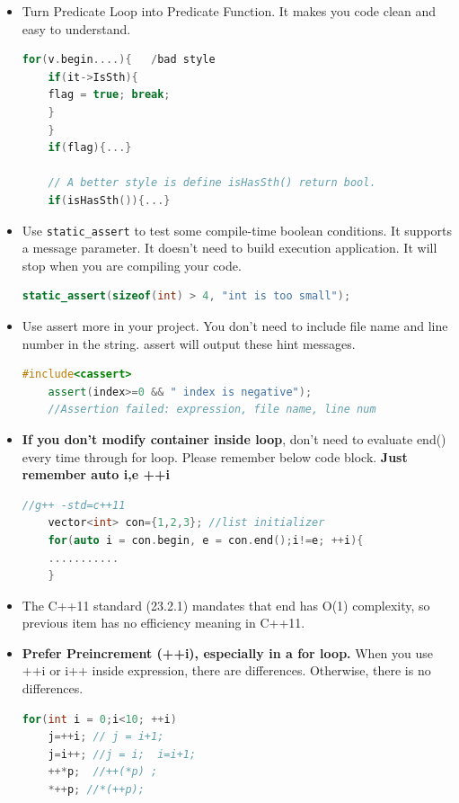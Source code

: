 \documentclass[a4paper,11pt,twoside]{book}
\begin{document}
\begin{itemize}
	\item Turn Predicate Loop into Predicate Function. It makes you code clean and easy to understand.
	
	\begin{lstlisting}[frame=single, language=c++]
	for(v.begin....){   /bad style
	if(it->IsSth){
	flag = true; break;
	}
	}
	if(flag){...}
	
	// A better style is define isHasSth() return bool.
	if(isHasSth()){...}
	\end{lstlisting}
	
	\item Use \texttt{static\_assert} to test some compile-time boolean conditions. It supports a message parameter. It doesn't need to build execution application. It will stop when you are compiling your code. 
	\begin{lstlisting}[frame=single, language=c++]
	static_assert(sizeof(int) > 4, "int is too small");
	\end{lstlisting}
	
	\item Use assert more in your project. You don't need to include file name and line number in the string. assert will output these hint messages.
	\begin{lstlisting}[frame=single, language=c++]
	#include<cassert>
	assert(index>=0 && " index is negative");
	//Assertion failed: expression, file name, line num
	\end{lstlisting}
	
	\item \textbf{If you don't modify container inside loop}, don't need to evaluate end() every time through for loop. Please remember below code block. \textbf{Just remember auto i,e ++i}
	\begin{lstlisting}[frame=single, language=c++]
	//g++ -std=c++11
	vector<int> con={1,2,3}; //list initializer
	for(auto i = con.begin, e = con.end();i!=e; ++i){
	...........
	}
	\end{lstlisting}
	
	\item The C++11 standard (23.2.1) mandates that end has O(1) complexity, so previous item has no efficiency meaning in C++11.
	
	
	\item \textbf{Prefer Preincrement (++i), especially in a for loop.}  When you use ++i or i++ inside expression, there are differences. Otherwise, there is no differences.
	\begin{lstlisting}[frame=single, language=c++]
	for(int i = 0;i<10; ++i)
	j=++i; // j = i+1;
	j=i++; //j = i;  i=i+1;
	++*p;  //++(*p) ;
	*++p; //*(++p);
	\end{lstlisting}
	

\end{itemize}
\end{document}
